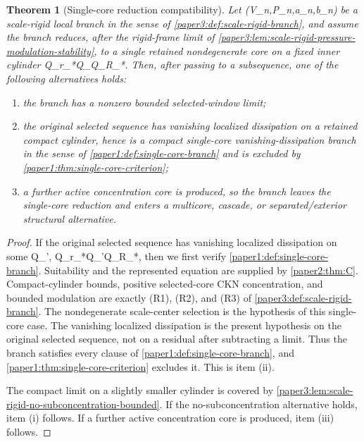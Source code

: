 \documentclass[11pt]{amsart}
\def\({}%
\def\){}%
\theoremstyle{plain}
\newtheorem{theorem}{Theorem}[section]
\theoremstyle{definition}
\theoremstyle{remark}
\begin{document}
\begin{theorem}[Single-core reduction compatibility]
\label{paper3:thm:scale-rigid-single-core-compatibility}
Let \((V_n,P_n,a_n,b_n)\) be a scale-rigid local branch in the sense of
\cref{paper3:def:scale-rigid-branch}, and assume the branch reduces, after
the rigid-frame limit of
\cref{paper3:lem:scale-rigid-pressure-modulation-stability}, to a single
retained nondegenerate core on a fixed inner cylinder
\(Q_{r_*}\Subset Q_{\rho}\Subset Q_{R_*}\).  Then, after passing to a
subsequence, one of the following alternatives holds:
\begin{enumerate}[label=\textup{(\roman*)}]
\item the branch has a nonzero bounded selected-window limit;
\item the original selected sequence has vanishing localized dissipation on a
      retained compact cylinder, hence is a compact single-core
      vanishing-dissipation branch in the sense of
      \cref{paper1:def:single-core-branch} and is excluded by
      \cref{paper1:thm:single-core-criterion};
\item a further active concentration core is produced, so the branch leaves the
      single-core reduction and enters a multicore, cascade, or
      separated/exterior structural alternative.
\end{enumerate}
\end{theorem}

\begin{proof}
If the original selected sequence has vanishing localized dissipation on some
\(Q_{\rho'}\), \(Q_{r_*}\Subset Q_{\rho'}\Subset Q_{R_*}\), then we first verify
\cref{paper1:def:single-core-branch}.  Suitability and the represented
equation are supplied by \cref{paper2:thm:C}.  Compact-cylinder bounds,
positive selected-core CKN concentration, and bounded modulation are exactly
(R1), (R2), and (R3) of \cref{paper3:def:scale-rigid-branch}.  The
nondegenerate scale-center selection is the hypothesis of this single-core
case.  The vanishing localized dissipation is the present hypothesis on the
original selected sequence, not on a residual after subtracting a limit.  Thus
the branch satisfies every clause of
\cref{paper1:def:single-core-branch}, and
\cref{paper1:thm:single-core-criterion} excludes it.  This is item
\textup{(ii)}.

The compact limit on a slightly smaller cylinder is covered by
\cref{paper3:lem:scale-rigid-no-subconcentration-bounded}.  If the
no-subconcentration alternative holds, item \textup{(i)} follows.  If a further
active concentration core is produced, item \textup{(iii)} follows.
\end{proof}
\end{document}
